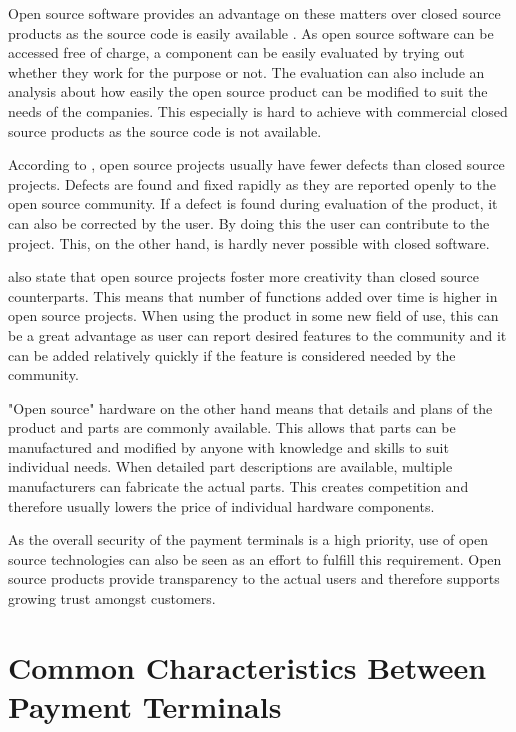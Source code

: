 Open source software provides an advantage on these matters over closed source products as the source code is easily available \emph{\citep{morgan2007benefits}}. As open source software can be accessed free of charge, a component can be easily evaluated by trying out whether they work for the purpose or not. The evaluation can also include an analysis about how easily the open source product can be modified to suit the needs of the companies. This especially is hard to achieve with commercial closed source products as the source code is not available.

According to \emph{\cite{paulson2004empirical}}, open source projects usually have fewer defects than closed source projects. Defects are found and fixed rapidly as they are reported openly to the open source community. If a defect is found during evaluation of the product, it can also be corrected by the user. By doing this the user can contribute to the project. This, on the other hand, is hardly never possible with closed software.

\emph{\cite{paulson2004empirical}} also state that open source projects foster more creativity than closed source counterparts. This means that number of functions added over time is higher in open source projects. When using the product in some new field of use, this can be a great advantage as user can report desired features to the community and it can be added relatively quickly if the feature is considered needed by the community.

"Open source" hardware on the other hand means that details and plans of the product and parts are commonly available. This allows that parts can be manufactured and modified by anyone with knowledge and skills to suit individual needs. When detailed part descriptions are available, multiple manufacturers can fabricate the actual parts. This creates competition and therefore usually lowers the price of individual hardware components.

As the overall security of the payment terminals is a high priority, use of open source technologies can also be seen as an effort to fulfill this requirement. Open source products provide transparency to the actual users and therefore supports growing trust amongst customers.

\section{Common Characteristics Between Payment Terminals}
\label{section:payment terminals}

